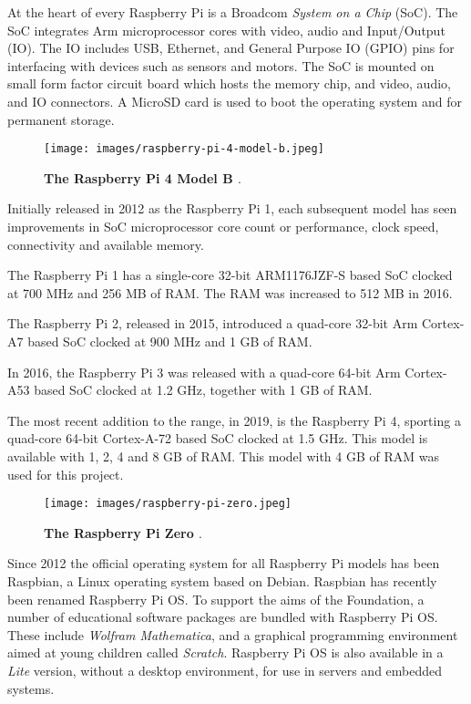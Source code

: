 At the heart of every Raspberry Pi is a Broadcom \emph{System on a Chip} (SoC). The SoC integrates Arm microprocessor cores with video, audio and Input/Output (IO). The IO includes USB, Ethernet, and General Purpose IO (GPIO) pins for interfacing with devices such as sensors and motors. The SoC is mounted on small form factor circuit board which hosts the memory chip, and video, audio, and IO connectors. A MicroSD card is used to boot the operating system and for permanent storage.

\begin{figure}
	\centering	
	\texttt{[image: images/raspberry-pi-4-model-b.jpeg]}
	\caption{\textbf{The Raspberry Pi 4 Model B \cite{raspberry-pi-4b}}.}
\end{figure}

Initially released in 2012 as the Raspberry Pi 1, each subsequent model has seen improvements in SoC microprocessor core count or performance, clock speed, connectivity and available memory.

The Raspberry Pi 1 has a single-core 32-bit ARM1176JZF-S based SoC clocked at 700 MHz and 256 MB of RAM. The RAM was increased to 512 MB in 2016.

The Raspberry Pi 2, released in 2015, introduced a quad-core 32-bit Arm Cortex-A7 based SoC clocked at 900 MHz and 1 GB of RAM.

In 2016, the Raspberry Pi 3 was released with a quad-core 64-bit Arm Cortex-A53 based SoC clocked at 1.2 GHz, together with 1 GB of RAM.

The most recent addition to the range, in 2019, is the Raspberry Pi 4, sporting a quad-core 64-bit Cortex-A-72 based SoC clocked at 1.5 GHz. This model is available with 1, 2, 4 and 8 GB of RAM. This model with 4 GB of RAM was used for this project.

\begin{figure}
	\centering	
	\texttt{[image: images/raspberry-pi-zero.jpeg]}
	\caption{\textbf{The Raspberry Pi Zero \cite{raspberry-pi-zero}}.}
\end{figure}

Since 2012 the official operating system for all Raspberry Pi models has been Raspbian, a Linux operating system based on Debian. Raspbian has recently been renamed Raspberry Pi OS. To support the aims of the Foundation, a number of educational software packages are bundled with Raspberry Pi OS. These include \emph{Wolfram Mathematica}, and a graphical programming environment aimed at young children called \emph{Scratch}. Raspberry Pi OS is also available in a \emph{Lite} version, without a desktop environment, for use in servers and embedded systems.

